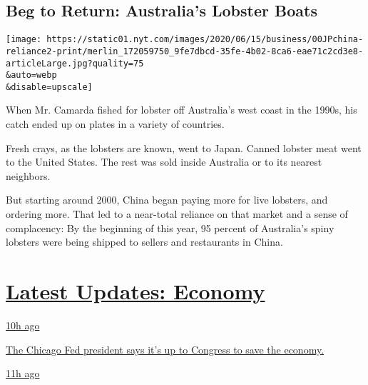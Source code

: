 \hypertarget{beg-to-return-australias-lobster-boats}{%
\subsection{Beg to Return: Australia's Lobster
Boats}\label{beg-to-return-australias-lobster-boats}}

\texttt{[image: https://static01.nyt.com/images/2020/06/15/business/00JPchina-reliance2-print/merlin\_172059750\_9fe7dbcd-35fe-4b02-8ca6-eae71c2cd3e8-articleLarge.jpg?quality=75\\\&auto=webp\\\&disable=upscale]}

When Mr. Camarda fished for lobster off Australia's west coast in the
1990s, his catch ended up on plates in a variety of countries.

Fresh crays, as the lobsters are known, went to Japan. Canned lobster
meat went to the United States. The rest was sold inside Australia or to
its nearest neighbors.

But starting around 2000, China began paying more for live lobsters, and
ordering more. That led to a near-total reliance on that market and a
sense of complacency: By the beginning of this year, 95 percent of
Australia's spiny lobsters were being shipped to sellers and restaurants
in China.

\hypertarget{latest-updates-economy}{%
\section{\texorpdfstring{\href{https://www.nytimes.com/live/2020/08/03/business/stock-market-today-coronavirus?action=click\&pgtype=Article\&state=default\&region=MAIN_CONTENT_1\&context=storylines_live_updates}{Latest
Updates:
Economy}}{Latest Updates: Economy}}\label{latest-updates-economy}}

\href{https://www.nytimes.com/live/2020/08/03/business/stock-market-today-coronavirus?action=click\&pgtype=Article\&state=default\&region=MAIN_CONTENT_1\&context=storylines_live_updates\#the-chicago-fed-president-says-its-up-to-congress-to-save-the-economy}{10h
ago}

\href{https://www.nytimes.com/live/2020/08/03/business/stock-market-today-coronavirus?action=click\&pgtype=Article\&state=default\&region=MAIN_CONTENT_1\&context=storylines_live_updates\#the-chicago-fed-president-says-its-up-to-congress-to-save-the-economy}{The
Chicago Fed president says it's up to Congress to save the economy.}

\href{https://www.nytimes.com/live/2020/08/03/business/stock-market-today-coronavirus?action=click\&pgtype=Article\&state=default\&region=MAIN_CONTENT_1\&context=storylines_live_updates\#faa-says-boeing-has-effectively-mitigated-defects-in-the-737-max}{11h
ago}

